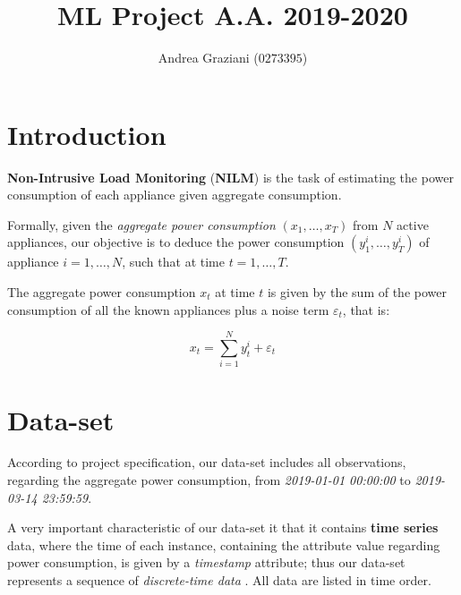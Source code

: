\documentclass[sigconf]{acmart}
\begin{document}
\title{ML Project A.A. 2019-2020}

\author{Andrea Graziani ($0273395$)}

\maketitle

\section{Introduction}

\textbf{Non-Intrusive Load Monitoring} (\textbf{NILM}) is the task of estimating the power consumption of each appliance given aggregate consumption. 

Formally, given the \textit{aggregate power consumption} $(x_1, \ldots , x_T )$ from $N$ active appliances, our objective is to deduce the power consumption $(y_1^i, \ldots , y_T^i)$ of appliance $i = 1, \ldots, N$, such that at time $t = 1, \ldots, T$.

The aggregate power consumption $x_t$ at time $t$ is given by the sum of the power consumption of all the known appliances plus a noise term $\varepsilon_t$, that is:

\begin{equation}
x_t = \sum_{i = 1}^N y^i_t + \varepsilon_t
\end{equation}

\section{Data-set}

According to project specification, our data-set includes all observations, regarding the aggregate power consumption, from \textit{2019-01-01 00:00:00} to \textit{2019-03-14 23:59:59}.

A very important characteristic of our data-set it that it contains \textbf{time series} data, where the time of each instance, containing the attribute value regarding power consumption, is given by a \textit{timestamp} attribute; thus our data-set represents a sequence of \textit{discrete-time data} \citep{FalessiDataMining}. All data are listed in time order.
\end{document}
